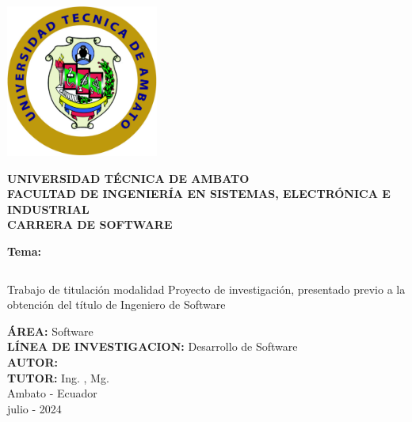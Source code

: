 \begin{titlepage}
	\begin{center}

		\includegraphics[width=50mm]{resources/images/logo-uta.png}

		\textbf{\uppercase{
				Universidad Técnica de Ambato \\
				\vspace{5mm}
				Facultad de Ingeniería en sistemas, electrónica e industrial \\
				\vspace{5mm}
				carrera de software \\
			}}

		\vspace{5mm}
		\textbf{Tema:}
		\vspace{5mm}

		\begin{tabular}[c]{>{\centering\arraybackslash}p{}}
			\toprule
			{\bfseries\MakeUppercase\tema} \\
			\bottomrule
		\end{tabular}

    \vspace{24pt}
		Trabajo de titulación modalidad Proyecto de investigación, presentado
		previo a la obtención del título de Ingeniero de Software

		\vspace{5mm}
		\textbf{\uppercase{área:}} Software\\
		\vspace{5mm}
		\textbf{\uppercase{línea de investigacion:}} Desarrollo de Software\\
		\vspace{5mm}
		\textbf{\uppercase{autor:}} \autor \\
		\vspace{5mm}
		\textbf{\uppercase{tutor:}} Ing. \tutor, Mg.\\

		\vfill
		Ambato - Ecuador\\
		julio - 2024

	\end{center}
\end{titlepage}
